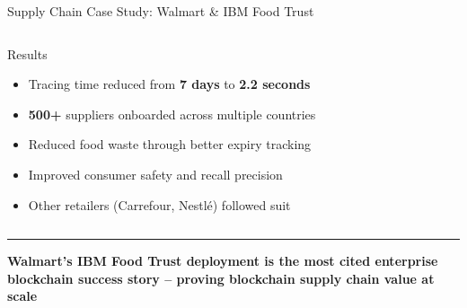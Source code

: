 \documentclass[8pt,aspectratio=169]{beamer}
\newcommand{\bottomnote}[1]{\vfill\vspace{-2mm}\textcolor{mllavender2}{\rule{\textwidth}{0.4pt}}\vspace{1mm}\footnotesize\textbf{#1}}
\begin{document}
\begin{frame}{Supply Chain Case Study: Walmart \& IBM Food Trust}
\begin{columns}[T]
\begin{block}{Results}
\footnotesize
\begin{itemize}
  \item Tracing time reduced from \textbf{7 days} to \textbf{2.2 seconds}
  \item \textbf{500+} suppliers onboarded across multiple countries
  \item Reduced food waste through better expiry tracking
  \item Improved consumer safety and recall precision
  \item Other retailers (Carrefour, Nestl\'{e}) followed suit
\end{itemize}
\end{block}
\vspace{2mm}
\centering
{}
\end{columns}
\bottomnote{Walmart's IBM Food Trust deployment is the most cited enterprise blockchain success story -- proving blockchain supply chain value at scale}
\end{frame}
\end{document}
